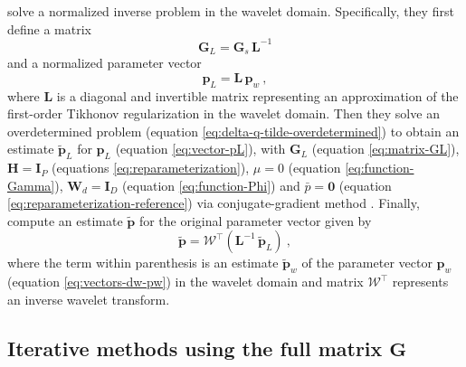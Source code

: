 \citet{li-oldenburg_2010} solve a normalized inverse problem in the wavelet domain.
Specifically, they first define a matrix
\begin{equation}
	\mathbf{G}_{L} = \mathbf{G}_{s} \, \mathbf{L}^{-1}
	\label{eq:matrix-GL}
\end{equation}
and a normalized parameter vector 
\begin{equation}
	\mathbf{p}_{L} = \mathbf{L} \, \mathbf{p}_{w} \: ,
	\label{eq:vector-pL}
\end{equation}
where $\mathbf{L}$ is a diagonal and invertible matrix representing an approximation of the 
first-order Tikhonov regularization in the wavelet domain.
Then they solve an overdetermined problem (equation \ref{eq:delta-q-tilde-overdetermined}) 
to obtain an estimate $\tilde{\mathbf{p}}_{L}$ for $\mathbf{p}_{L}$ (equation \ref{eq:vector-pL}), 
with $\mathbf{G}_{L}$ (equation \ref{eq:matrix-GL}), 
$\mathbf{H} = \mathbf{I}_{P}$ (equations \ref{eq:reparameterization}),
$\mu = 0$ (equation \ref{eq:function-Gamma}), 
$\mathbf{W}_{d} = \mathbf{I}_{D}$ (equation \ref{eq:function-Phi}) and 
$\bar{p} = \mathbf{0}$ (equation \ref{eq:reparameterization-reference}) via 
conjugate-gradient method \cite[e.g.,][sec. 11.3]{golub-vanloan2013}.
Finally, \citet{li-oldenburg_2010} compute an estimate $\tilde{\mathbf{p}}$ for the original parameter vector given by
\begin{equation}
	\tilde{\mathbf{p}} = \boldsymbol{\mathcal{W}}^{\top} \left( \mathbf{L}^{-1} \, \tilde{\mathbf{p}}_{L} \right) \: ,
	\label{eq:vector-p-tilde-LO10}
\end{equation}
where the term within parenthesis is an estimate $\tilde{\mathbf{p}}_{w}$ of the parameter vector $\mathbf{p}_{w}$
(equation \ref{eq:vectors-dw-pw}) in the wavelet domain and 
matrix $\boldsymbol{\mathcal{W}}^{\top}$ represents an inverse wavelet transform. 

\subsection{Iterative methods using the full matrix $\mathbf{G}$}

